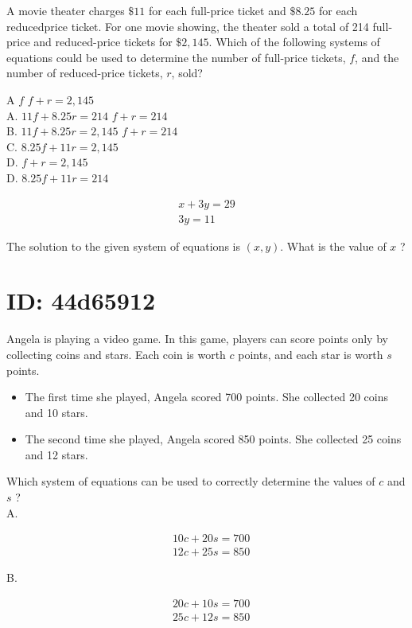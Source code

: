 A movie theater charges $\$ 11$ for each full-price ticket and $\$ 8.25$ for each reducedprice ticket. For one movie showing, the theater sold a total of 214 full-price and reduced-price tickets for $\$ 2,145$. Which of the following systems of equations could be used to determine the number of full-price tickets, $f$, and the number of reduced-price tickets, $r$, sold?

A $f$ $f+r=2,145$\\
A. $11 f+8.25 r=214$ $f+r=214$\\
B. $11 f+8.25 r=2,145$ $f+r=214$\\
C. $8.25 f+11 r=2,145$\\
D. $f+r=2,145$\\
D. $8.25 f+11 r=214$

$$
\begin{gathered}
x+3 y=29 \\
3 y=11
\end{gathered}
$$

The solution to the given system of equations is $(x, y)$. What is the value of $x$ ?

\section*{ID: 44d65912}
Angela is playing a video game. In this game, players can score points only by collecting coins and stars. Each coin is worth $c$ points, and each star is worth $s$ points.

\begin{itemize}
  \item The first time she played, Angela scored 700 points. She collected 20 coins and 10 stars.
  \item The second time she played, Angela scored 850 points. She collected 25 coins and 12 stars.
\end{itemize}

Which system of equations can be used to correctly determine the values of $c$ and $s$ ?\\
A.

$$
\begin{aligned}
& 10 c+20 s=700 \\
& 12 c+25 s=850
\end{aligned}
$$

B.

$$
\begin{aligned}
& 20 c+10 s=700 \\
& 25 c+12 s=850
\end{aligned}
$$

